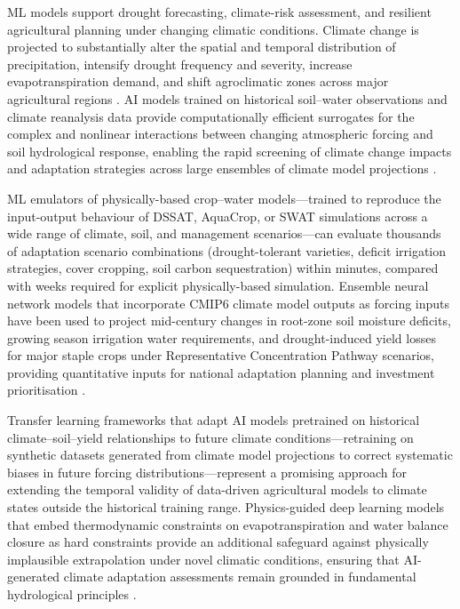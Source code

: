 \documentclass[land,article,submit,pdftex,moreauthors]{Definitions/mdpi}
\numberwithin{equation}{section}
\begin{document}
ML models support drought forecasting, climate-risk assessment, and resilient agricultural planning under changing climatic conditions. Climate change is projected to substantially alter the spatial and temporal distribution of precipitation, intensify drought frequency and severity, increase evapotranspiration demand, and shift agroclimatic zones across major agricultural regions \citep{ipcc2022ar6}. AI models trained on historical soil--water observations and climate reanalysis data provide computationally efficient surrogates for the complex and nonlinear interactions between changing atmospheric forcing and soil hydrological response, enabling the rapid screening of climate change impacts and adaptation strategies across large ensembles of climate model projections \citep{trnka2022soil}.

ML emulators of physically-based crop--water models---trained to reproduce the input-output behaviour of DSSAT, AquaCrop, or SWAT simulations across a wide range of climate, soil, and management scenarios---can evaluate thousands of adaptation scenario combinations (drought-tolerant varieties, deficit irrigation strategies, cover cropping, soil carbon sequestration) within minutes, compared with weeks required for explicit physically-based simulation. Ensemble neural network models that incorporate CMIP6 climate model outputs as forcing inputs have been used to project mid-century changes in root-zone soil moisture deficits, growing season irrigation water requirements, and drought-induced yield losses for major staple crops under Representative Concentration Pathway scenarios, providing quantitative inputs for national adaptation planning and investment prioritisation \citep{trnka2022soil}.

Transfer learning frameworks that adapt AI models pretrained on historical climate--soil--yield relationships to future climate conditions---retraining on synthetic datasets generated from climate model projections to correct systematic biases in future forcing distributions---represent a promising approach for extending the temporal validity of data-driven agricultural models to climate states outside the historical training range. Physics-guided deep learning models that embed thermodynamic constraints on evapotranspiration and water balance closure as hard constraints provide an additional safeguard against physically implausible extrapolation under novel climatic conditions, ensuring that AI-generated climate adaptation assessments remain grounded in fundamental hydrological principles \citep{willard2022integrating}.
\end{document}
